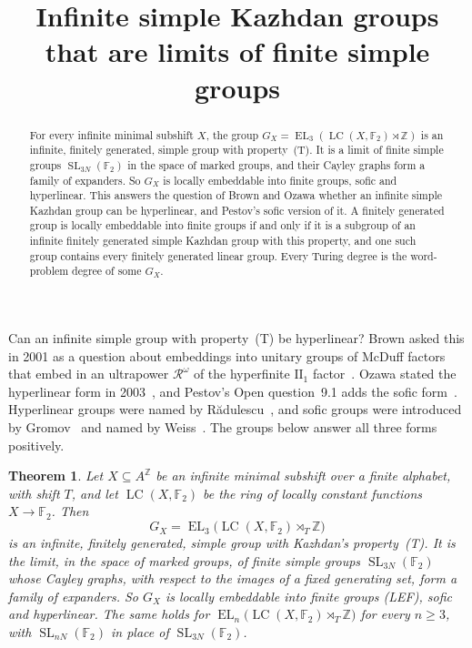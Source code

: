 \documentclass[11pt]{amsart}
\newtheorem{theorem}{Theorem}
\newcommand{\F}{\mathbb F}
\newcommand{\Z}{\mathbb Z}
\newcommand{\LC}{\operatorname{LC}}
\newcommand{\EL}{\operatorname{EL}}
\newcommand{\SL}{\operatorname{SL}}
\begin{document}
\title{Infinite simple Kazhdan groups that are limits of finite simple groups}
\author{\paperauthorname}
\date{}

\begin{abstract}
For every infinite minimal subshift $X$, the group
$G_X=\EL_3(\LC(X,\F_2)\rtimes\Z)$ is an infinite, finitely generated,
simple group with property~\textup{(T)}. It is a limit of finite simple
groups $\SL_{3N}(\F_2)$ in the space of marked groups, and their Cayley
graphs form a family of expanders. So $G_X$ is locally embeddable into
finite groups, sofic and hyperlinear. This answers the question of Brown
and Ozawa whether an infinite simple Kazhdan group can be hyperlinear,
and Pestov's sofic version of it. A finitely generated group is locally
embeddable into finite groups if and only if it is a subgroup of an
infinite finitely generated simple Kazhdan group with this property, and
one such group contains every finitely generated linear group. Every
Turing degree is the word-problem degree of some $G_X$.
\end{abstract}
\maketitle

Can an infinite simple group with property~\textup{(T)} be hyperlinear?
Brown asked this in 2001 as a question about embeddings into unitary
groups of McDuff factors that embed in an ultrapower $\mathcal R^\omega$
of the hyperfinite $\mathrm{II}_1$ factor~\cite[\S11, Question~7]{Brown}.
Ozawa stated the hyperlinear form in 2003~\cite[p.~527]{Ozawa}, and
Pestov's Open question~9.1 adds the sofic form~\cite{Pestov}. Hyperlinear
groups were named by R\u{a}dulescu~\cite{Radulescu}, and sofic groups were
introduced by Gromov~\cite{Gromov} and named by Weiss~\cite{Weiss}. The
groups below answer all three forms positively.

\begin{theorem}\label{thm:main}
Let $X\subseteq A^{\Z}$ be an infinite minimal subshift over a finite
alphabet, with shift $T$, and let $\LC(X,\F_2)$ be the ring of locally
constant functions $X\to\F_2$. Then
\[
  G_X=\EL_3\bigl(\LC(X,\F_2)\rtimes_T\Z\bigr)
\]
is an infinite, finitely generated, simple group with Kazhdan's
property~\textup{(T)}. It is the limit, in the space of marked groups, of
finite simple groups $\SL_{3N}(\F_2)$ whose Cayley graphs, with respect to
the images of a fixed generating set, form a family of expanders. So $G_X$
is locally embeddable into finite groups \textup{(LEF)}, sofic and
hyperlinear. The same holds for $\EL_n\bigl(\LC(X,\F_2)\rtimes_T\Z\bigr)$
for every $n\ge3$, with $\SL_{nN}(\F_2)$ in place of $\SL_{3N}(\F_2)$.
\end{theorem}
\end{document}
